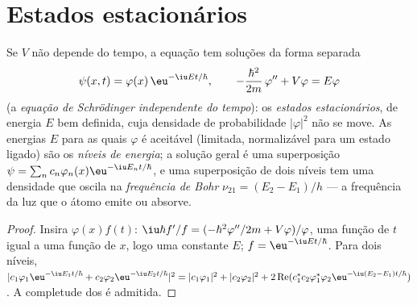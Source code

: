 \section{Estados estacionários}

\begin{theorem}\label{thm:b2:schrodinger-wave-functions:stationary}
Se $V$ não depende do tempo, a equação tem soluções da
forma separada
\[
\psi(x,t) = \varphi(x)\,\eu^{-\iu Et/\hbar}, \qquad
-\frac{\hbar^2}{2m}\,\varphi'' + V\varphi = E\varphi
\]
(a \emph{equação de Schrödinger independente do tempo}): os \emph{estados estacionários}, de energia $E$ bem definida, cuja densidade de probabilidade
$|\varphi|^2$ não se move. As energias $E$ para as quais $\varphi$ é
aceitável (limitada, normalizável para um estado ligado) são os
\emph{níveis de energia}; a solução geral é uma superposição $\psi =
\sum_nc_n\varphi_n(x)\eu^{-\iu E_nt/\hbar}$, e uma superposição de dois níveis
tem uma densidade que oscila na \emph{frequência de Bohr} $\nu_{21} = (E_2 - E_1)/h$ --- a frequência da luz que o
átomo emite ou absorve.
\end{theorem}

\begin{proof}
Insira $\varphi(x)f(t)$: $\iu\hbar f'/f = (-\hbar^2\varphi''/2m + V\varphi)/\varphi$,
uma função de $t$ igual a uma função de $x$, logo uma constante $E$; $f
= \eu^{-\iu Et/\hbar}$. Para dois níveis, $|c_1\varphi_1\eu^{-\iu E_1t/\hbar} +
c_2\varphi_2\eu^{-\iu E_2t/\hbar}|^2 = |c_1\varphi_1|^2 + |c_2\varphi_2|^2 +
2\operatorname{Re}(c_1^*c_2\varphi_1^*\varphi_2\eu^{-\iu(E_2 - E_1)t/\hbar})$.
A completude dos  é admitida.
\end{proof}

